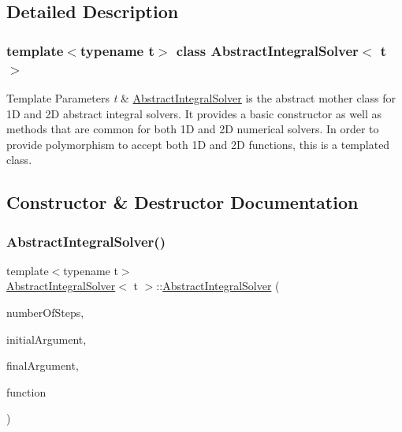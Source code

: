 \subsection{Detailed Description}
\subsubsection*{template$<$typename t$>$\newline
class Abstract\+Integral\+Solver$<$ t $>$}


\begin{DoxyTemplParams}{Template Parameters}
{\em t} & \hyperlink{class_abstract_integral_solver}{Abstract\+Integral\+Solver} is the abstract mother class for 1D and 2D abstract integral solvers. It provides a basic constructor as well as methods that are common for both 1D and 2D numerical solvers. In order to provide polymorphism to accept both 1D and 2D functions, this is a templated class. \\
\hline
\end{DoxyTemplParams}


\subsection{Constructor \& Destructor Documentation}
\mbox{\label{class_abstract_integral_solver_a44d64706b428c7b0bd4c9779c4d32b6f}} 
\subsubsection{\texorpdfstring{Abstract\+Integral\+Solver()}{AbstractIntegralSolver()}}
{\footnotesize\ttfamily template$<$typename t$>$ \\
\hyperlink{class_abstract_integral_solver}{Abstract\+Integral\+Solver}$<$ t $>$\+::\hyperlink{class_abstract_integral_solver}{Abstract\+Integral\+Solver} (\begin{DoxyParamCaption}\item[{int}]{number\+Of\+Steps,  }\item[{double}]{initial\+Argument,  }\item[{double}]{final\+Argument,  }\item[{t}]{function }\end{DoxyParamCaption})}

